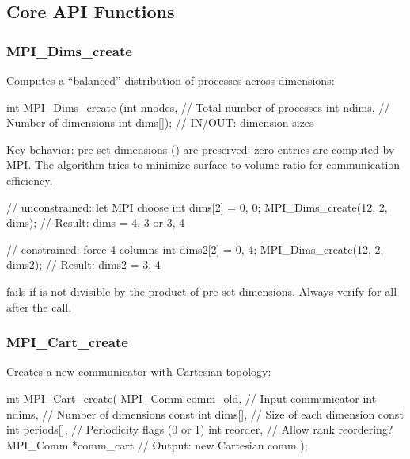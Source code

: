 \subsection{Core API Functions}

\subsubsection{MPI\_Dims\_create}

Computes a ``balanced'' distribution of processes across dimensions:

\begin{codeblock}[language=C]
int MPI_Dims_create (int nnodes,    // Total number of processes
                     int ndims,     // Number of dimensions
                     int dims[]);   // IN/OUT: dimension sizes
\end{codeblock}

Key behavior: pre-set dimensions () are preserved; zero entries are computed by MPI. The algorithm tries to minimize surface-to-volume ratio for communication efficiency.

\begin{exampleblock}
\begin{codeblock}[language=C]
// unconstrained: let MPI choose
int dims[2] = {0, 0};
MPI_Dims_create(12, 2, dims); // Result: dims = {4, 3} or {3, 4}

// constrained: force 4 columns
int dims2[2] = {0, 4};
MPI_Dims_create(12, 2, dims2); // Result: dims2 = {3, 4}
\end{codeblock}
\end{exampleblock}

\begin{warningblock}
     fails if  is not divisible by the product of pre-set dimensions. Always verify  for all  after the call.
\end{warningblock}

\subsubsection{MPI\_Cart\_create}

Creates a new communicator with Cartesian topology:

\begin{codeblock}[language=C]
int MPI_Cart_create(
    MPI_Comm comm_old,      // Input communicator
    int ndims,              // Number of dimensions
    const int dims[],       // Size of each dimension
    const int periods[],    // Periodicity flags (0 or 1)
    int reorder,            // Allow rank reordering?
    MPI_Comm *comm_cart     // Output: new Cartesian comm
);
\end{codeblock}

